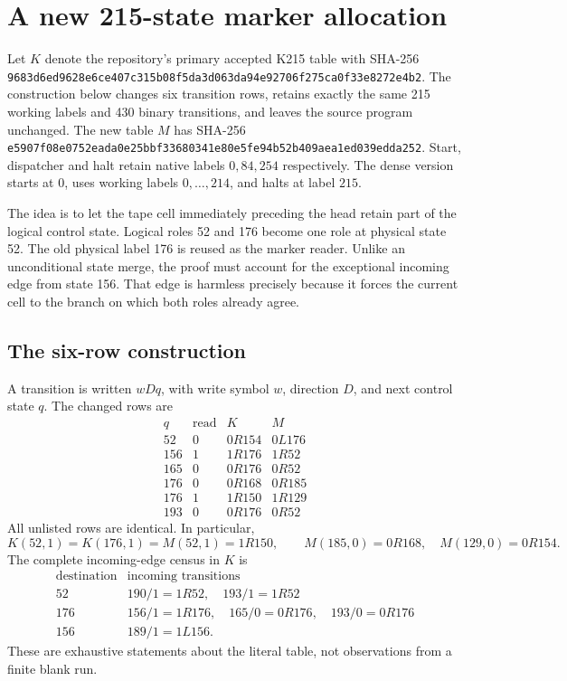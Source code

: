 \section{A new 215-state marker allocation}
\label{sec:marker215}

Let $K$ denote the repository's primary accepted K215 table with SHA-256
\texttt{9683d6ed9628e6ce407c315b08f5da3d063da94e92706f275ca0f33e8272e4b2}.
The construction below changes six transition rows, retains exactly the same
215 working labels and 430 binary transitions, and leaves the source program
unchanged.  The new table $M$ has SHA-256
\texttt{e5907f08e0752eada0e25bbf33680341e80e5fe94b52b409aea1ed039edda252}.
Start, dispatcher and halt retain native labels $0,84,254$ respectively.
The dense version starts at $0$, uses working labels $0,\ldots,214$, and halts
at label $215$.

The idea is to let the tape cell immediately preceding the head retain part
of the logical control state.  Logical roles 52 and 176 become one role at
physical state 52.  The old physical label 176 is reused as the marker reader.
Unlike an unconditional state merge, the proof must account for the exceptional
incoming edge from state 156.  That edge is harmless precisely because it
forces the current cell to the branch on which both roles already agree.

\subsection{The six-row construction}

A transition is written $w D q$, with write symbol $w$, direction $D$, and
next control state $q$.  The changed rows are
\[
\begin{array}{c|c|c|c}
 q&\text{read}&K&M\\\hline
 52&0&0R154&0L176\\
 156&1&1R176&1R52\\
 165&0&0R176&0R52\\
 176&0&0R168&0R185\\
 176&1&1R150&1R129\\
 193&0&0R176&0R52
\end{array}
\]
All unlisted rows are identical.  In particular,
\[
 K(52,1)=K(176,1)=M(52,1)=1R150,
 \qquad M(185,0)=0R168,\quad M(129,0)=0R154.
\]
The complete incoming-edge census in $K$ is
\[
\begin{array}{c|l}
\text{destination}&\text{incoming transitions}\\\hline
52&190/1=1R52,\quad 193/1=1R52\\
176&156/1=1R176,\quad 165/0=0R176,\quad193/0=0R176\\
156&189/1=1L156.
\end{array}
\]
These are exhaustive statements about the literal table, not observations
from a finite blank run.

